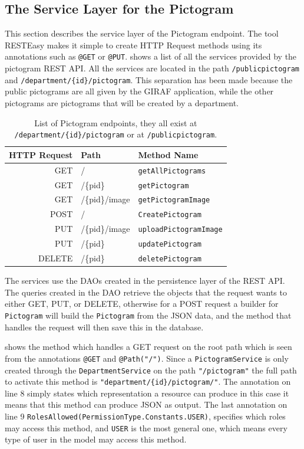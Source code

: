 \subsection{The Service Layer for the Pictogram}
This section describes the service layer of the Pictogram endpoint.
The tool RESTEasy makes it simple to create HTTP Request methods using its annotations such as \texttt{@GET} or \texttt{@PUT}.
 shows a list of all the services provided by the pictogram REST API.
All the services are located in the path \texttt{/publicpictogram} and \texttt{/department/\{id\}/pictogram}.
This separation has been made because the public pictograms are all given by the GIRAF application, while the other pictograms are pictograms that will be created by a department.

\begin{table}[]
\footnotesize
\centering
\begin{tabular}{rll}
HTTP Request    & Path          & Method Name                   \\
\midrule
GET             &/              & \texttt{getAllPictograms}     \\
GET             &/\{pid\}       & \texttt{getPictogram}         \\
GET             &/\{pid\}/image & \texttt{getPictogramImage}    \\
\tblgrpsep
POST            &/              & \texttt{CreatePictogram}      \\
\tblgrpsep
PUT             &/\{pid\}/image & \texttt{uploadPictogramImage} \\
PUT             &/\{pid\}       & \texttt{updatePictogram}      \\
\tblgrpsep
DELETE          &/\{pid\}	    & \texttt{deletePictogram}	    \\
\end{tabular}
\caption{List of Pictogram endpoints, they all exist at \texttt{/department/\{id\}/pictogram} or at \texttt{/publicpictogram}.}\label{tbl:pictogramservice}
\end{table}

The services use the DAOs created in the persistence layer of the REST API.
The queries created in the DAO retrieve the objects that the request wants to either GET, PUT, or DELETE, otherwise for a POST request a builder for \texttt{Pictogram} will build the \texttt{Pictogram} from the JSON data, and the method that handles the request will then save this in the database.

 shows the method which handles a GET request on the root path which is seen from the annotations \texttt{@GET} and \texttt{@Path("/")}.
Since a \texttt{PictogramService} is only created through the \texttt{DepartmentService} on the path \texttt{"/pictogram"} the full path to activate this method is \texttt{"department/\{id\}/pictogram/"}.
The annotation on line 8 simply states which representation a resource can produce in this case it means that this method can produce JSON as output.
The last annotation on line 9 \texttt{RolesAllowed({PermissionType.Constants.USER})}, specifies which roles may access this method, and \texttt{USER} is the most general one, which means every type of user in the model may access this method.


